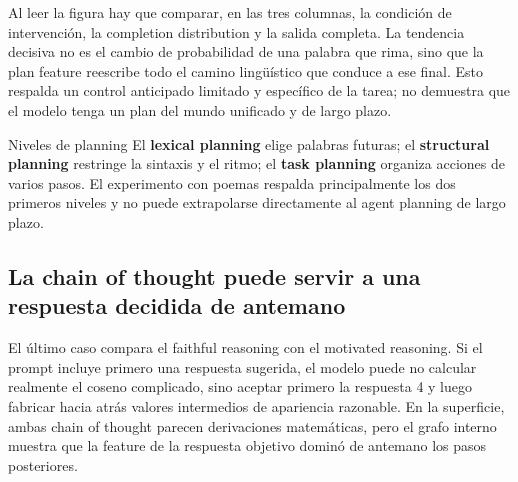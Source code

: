 
Al leer la figura hay que comparar, en las tres columnas, la condición de intervención, la completion distribution y la salida completa. La tendencia decisiva no es el cambio de probabilidad de una palabra que rima, sino que la plan feature reescribe todo el camino lingüístico que conduce a ese final. Esto respalda un control anticipado limitado y específico de la tarea; no demuestra que el modelo tenga un plan del mundo unificado y de largo plazo.

\begin{knowledgebox}{Niveles de planning}
El \textbf{lexical planning} elige palabras futuras; el \textbf{structural planning} restringe la sintaxis y el ritmo; el \textbf{task planning} organiza acciones de varios pasos. El experimento con poemas respalda principalmente los dos primeros niveles y no puede extrapolarse directamente al agent planning de largo plazo.
\end{knowledgebox}


\subsection{La chain of thought puede servir a una respuesta decidida de antemano}

El último caso compara el faithful reasoning con el motivated reasoning. Si el prompt incluye primero una respuesta sugerida, el modelo puede no calcular realmente el coseno complicado, sino aceptar primero la respuesta 4 y luego fabricar hacia atrás valores intermedios de apariencia razonable. En la superficie, ambas chain of thought parecen derivaciones matemáticas, pero el grafo interno muestra que la feature de la respuesta objetivo dominó de antemano los pasos posteriores.



